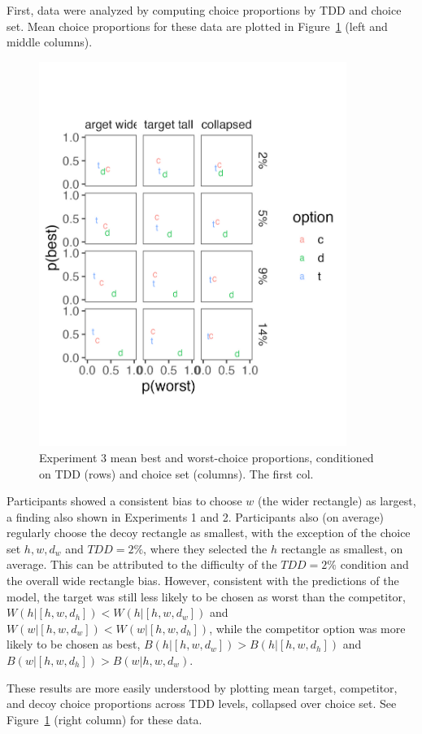 First, data were analyzed by computing choice proportions by TDD and choice set. Mean choice proportions for these data are plotted in Figure~\ref{fig:bw_mean_choice} (left and middle columns). 

\begin{figure}
   \includegraphics[width=100mm]{figures/crit_mean_props.jpeg}
   \caption{Experiment 3 mean best and worst-choice proportions, conditioned on TDD (rows) and choice set (columns). The first col.}
   \label{fig:bw_mean_choice}
\end{figure}

Participants showed a consistent bias to choose $w$ (the wider rectangle) as largest, a finding also shown in Experiments 1 and 2. Participants also (on average) regularly choose the decoy rectangle as smallest, with the exception of the choice set $h,w,d_{w}$ and $TDD=2\%$, where they selected the $h$ rectangle as smallest, on average. This can be attributed to the difficulty of the $TDD=2\%$ condition and the overall wide rectangle bias. However, consistent with the predictions of the model, the target was still less likely to be chosen as worst than the competitor, $W(h|[h,w,d_{h}])<W(h|[h,w,d_{w}])$ and $W(w|[h,w,d_{w}])<W(w|[h,w,d_{h}])$, while the competitor option was more likely to be chosen as best, $B(h|[h,w,d_{w}])>B(h|[h,w,d_{h}])$ and $B(w|[h,w,d_{h}])>B(w|{h,w,d_{w}})$. 

These results are more easily understood by plotting mean target, competitor, and decoy choice proportions across TDD levels, collapsed over choice set. See Figure~\ref{fig:bw_mean_choice} (right column) for these data. 

